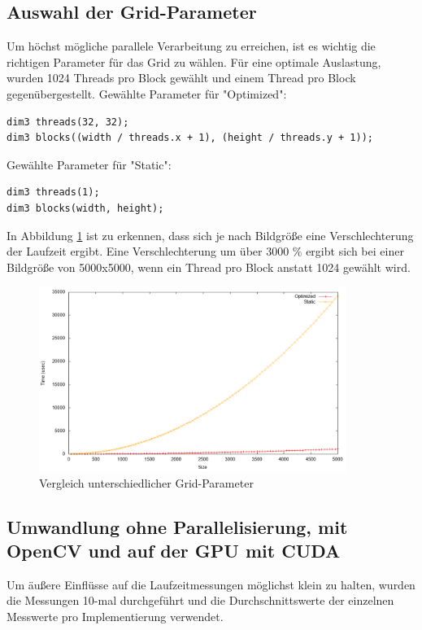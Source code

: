 \documentclass{llncs}
\begin{document}
%
\subsection{Auswahl der Grid-Parameter}
%

Um höchst mögliche parallele Verarbeitung zu erreichen, ist es wichtig die richtigen Parameter für das Grid zu wählen. Für eine optimale Auslastung, wurden 1024 Threads pro Block gewählt und einem Thread pro Block gegenübergestellt.
\newpage
Gewählte Parameter für "Optimized":
\begin{lstlisting}
dim3 threads(32, 32);
dim3 blocks((width / threads.x + 1), (height / threads.y + 1));
\end{lstlisting}

Gewählte Parameter für "Static":
\begin{lstlisting}
dim3 threads(1);
dim3 blocks(width, height);
\end{lstlisting}

In Abbildung \ref{fig:analysis_grids} ist zu erkennen, dass sich je nach Bildgröße eine Verschlechterung der Laufzeit ergibt. Eine Verschlechterung um über 3000 \% ergibt sich bei einer Bildgröße von 5000x5000, wenn ein Thread pro Block anstatt 1024 gewählt wird.

\begin{figure}
	\centering
	\includegraphics[width=10cm,keepaspectratio]{analysis_grids.png}
	\caption{Vergleich unterschiedlicher Grid-Parameter}
	\label{fig:analysis_grids}
\end{figure}


%
\subsection{Umwandlung ohne Parallelisierung, mit OpenCV und auf der GPU mit CUDA}
%

Um äußere Einflüsse auf die Laufzeitmessungen möglichst klein zu halten, wurden die Messungen 10-mal durchgeführt und die Durchschnittswerte der einzelnen Messwerte pro Implementierung verwendet.\\
\end{document}
